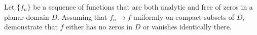 Let $\{f_n\}$ be a sequence of functions that are both analytic and
free of zeros in a planar domain $D$. Assuming that $f_n\rightarrow f$
uniformly on compact subsets of $D$, demonstrate that $f$ either has
no zeros in $D$ or vanishes identically there.
